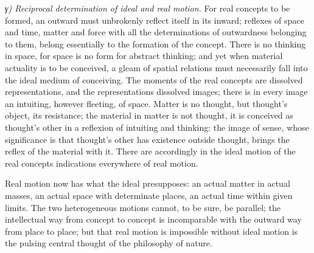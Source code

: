 \documentclass[12pt,a4paper]{book}
\newcommand{\subrunin}[1]{\emph{#1}\hspace{0.4em}}
\begin{document}
\subrunin{γ) Reciprocal determination of ideal and real motion.} For real concepts to be formed, an
outward must unbrokenly reflect itself in its inward; reflexes of space and time, matter and force
with all the determinations of outwardness belonging to them, belong essentially to the formation
of the concept. There is no thinking in space, for space is no form for abstract thinking; and yet
when material actuality is to be conceived, a gleam of spatial relations must necessarily fall into
the ideal medium of conceiving. The moments of the real concepts are dissolved
representations, and the representations dissolved images; there is in every image an intuiting,
however
fleeting, of space. Matter is no thought, but thought's object, its resistance; the material in
matter is not thought, it is conceived as thought's other in a reflexion of intuiting and thinking:
the image of sense, whose significance is that thought's other has existence outside thought, brings
the reflex of the material with it. There are accordingly in the ideal motion of the real concepts
indications everywhere of real motion.

Real motion now has what the ideal presupposes: an actual matter in actual masses, an actual space
with determinate places, an actual time within given limits. The two heterogeneous motions cannot,
to be sure, be parallel; the intellectual way from concept to concept is incomparable with the
outward way from place to place; but that real motion is impossible without ideal motion is the
pulsing central thought of the philosophy of nature.
\end{document}
